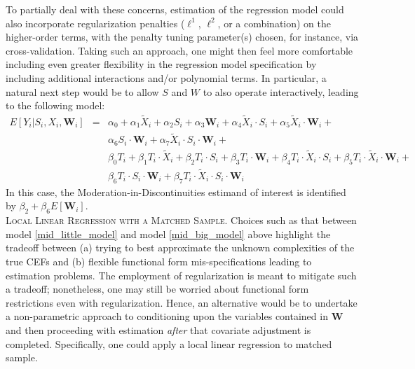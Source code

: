 \documentclass[12pt]{article}
\makeatletter
\renewcommand{\subsubsection}{\@startsection{subsubsection}{3}{0mm}{-\baselineskip}{0.25\baselineskip}{\raggedright\normalfont\small\bf}}
\makeatother
\begin{document}
To partially deal with these concerns, estimation of the regression model could also incorporate regularization penalties ($\ell^1$, $\ell^2$, or a combination) on the higher-order terms, with the penalty tuning parameter(s) chosen, for instance, via cross-validation. Taking such an approach, one might then feel more comfortable including even greater flexibility in the regression model specification by including additional interactions and/or polynomial terms. In particular, a natural next step would be to allow $S$ and $W$ to also operate interactively, leading to the following model:
\begin{eqnarray}
E[Y_i | S_i, X_i, \bm{W}_i] & = & \alpha_0 + \alpha_1 \tilde{X}_i + \alpha_2 S_i + \alpha_3 \bm{W}_i + \alpha_4 \tilde{X}_i \cdot S_i + \alpha_5 \tilde{X}_i \cdot \bm{W}_i + \label{mid_big_model} \\
& & \alpha_6 S_i \cdot \bm{W}_i  + \alpha_7 \tilde{X}_i \cdot S_i \cdot \bm{W}_i + \nonumber \\
& & \beta_0 T_i  + \beta_1 T_i \cdot \tilde{X}_i + \beta_2 T_i \cdot S_i + \beta_3 T_i \cdot \bm{W}_i + \beta_4 T_i \cdot \tilde{X}_i \cdot S_i + \beta_5 T_i \cdot \tilde{X}_i \cdot \bm{W}_i  + \nonumber \\
& & \beta_6 T_i \cdot S_i \cdot \bm{W}_i  + \beta_7 T_i \cdot \tilde{X}_i \cdot S_i \cdot \bm{W}_i \nonumber
\end{eqnarray}
In this case, the Moderation-in-Discontinuities estimand of interest is identified by $\beta_2 + \beta_6 E[\bm{W}_i]$. \\





\noindent \textsc{Local Linear Regression with a Matched Sample}. Choices such as that between model \eqref{mid_little_model} and model \eqref{mid_big_model} above highlight the tradeoff between (a) trying to best approximate the unknown complexities of the true CEFs and (b) flexible functional form mis-specifications leading to estimation problems. The employment of regularization is meant to mitigate such a tradeoff; nonetheless, one may still be worried about functional form restrictions even with regularization. Hence, an alternative would be to undertake a non-parametric approach to conditioning upon the variables contained in $\bm{W}$ and then proceeding with estimation \emph{after} that covariate adjustment is completed. Specifically, one could apply a local linear regression to matched sample.
\end{document}
